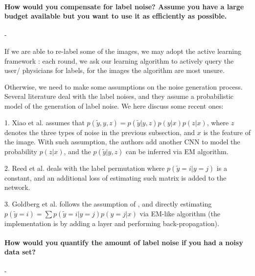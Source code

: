 \documentclass[11pt]{article}
\begin{document}
\paragraph{How would you compensate for label noise? Assume you have a large budget available but you want to use it as efficiently as possible.} -

If we are able to re-label some of the images, we may adopt the active learning framework \cite{settles2010active}: each round, we ask our learning algorithm to actively query the user/ physicians for labels, for the images the algorithm are most unsure.

Otherwise, we need to make some assumptions on the noise generation process. Several literature deal with the label noises, and they assume a probabilistic model of the generation of label noise. We here discuss some recent ones:

1. Xiao et al. \cite{xiao2015learning} assumes that $p(\tilde{y} , y,z) = p(\tilde{y} | y,z) p(y|x) p(z|x)$, where $z$ denotes the three types of noise in the previous subsection, and $x$ is the feature of the image. With such assumption, the authors add another CNN to model the probability $p(z|x)$, and the $p(\tilde{y} | y,z)$ can be inferred via EM algorithm.

2. Reed et al. \cite{reed2014training} deals with the label permutation where $p(\tilde{y} = i | y =j) $ is a constant, and an additional loss of estimating such matrix is added to the network.

3. Goldberg et al. \cite{gold2017training} follows the assumption of \cite{reed2014training}, and directly estimating $p(\tilde{y} = i) = \sum p(\tilde{y} = i | y = j) p(y = j | x)$ via EM-like algorithm (the implementation is by adding a layer and performing back-propagation).

\paragraph{How would you quantify the amount of label noise if you had a noisy data set?} -
\end{document}
